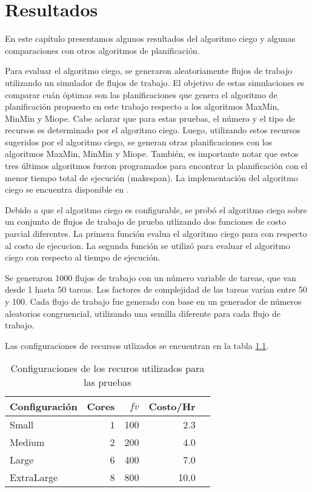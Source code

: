 \chapter{Resultados}
\label{chap:results}

En este capítulo presentamos algunos resultados del algoritmo ciego y algunas comparaciones con otros algoritmos de planificación. 

Para evaluar el algoritmo ciego, se generaron aleatoriamente flujos de trabajo utilizando un simulador de flujos de trabajo. El objetivo de estas simulaciones es comparar cuán óptimas son las planificaciones que genera el algoritmo de planificación propuesto en este trabajo respecto a los algoritmos MaxMin, MinMin y Miope. Cabe aclarar que para estas pruebas, el número y el tipo de recursos es determinado por el algoritmo ciego. Luego, utilizando estos recursos sugeridos por el algoritmo ciego, se generan otras planificaciones con los algoritmos MaxMin, MinMin y Miope. También, es importante notar que estos tres \'ultimos algoritmos fueron programados para encontrar la planificación con el menor tiempo total de ejecución (makespan). La implementaci\'on del algoritmo ciego se encuentra disponible en \cite{dominofire2014workflowsimulator}.

Debido a que el algoritmo ciego es configurable, se prob\'o el algoritmo ciego sobre un conjunto de flujos de trabajo de prueba utlizando dos funciones de costo parcial diferentes. La primera funci\'on evalua el algoritmo ciego para con respecto al costo de ejecucion. La segunda funci\'on se utiliz\'o para evaluar el algoritmo ciego con respecto al tiempo de ejecuci\'on.

Se generaron 1000 flujos de trabajo con un número variable de tareas, que van desde 1 hasta 50 tareas. Los factores de complejidad de las tareas varían entre 50 y 100. Cada flujo de trabajo fue generado con base en un generador de números aleatorios congruencial, utilizando una semilla diferente para cada flujo de trabajo.

Las configuraciones de recursos utlizados se encuentran en la tabla \ref{table:resource_configurations}.

\begin{table}[ht]
\centering
\begin{tabular}{lrrrr}
  \hline
Configuraci\'on & Cores & $fv$ & Costo/Hr \\ 
  \hline
  Small & 1 & 100 & 2.3 \\ 
  Medium & 2 & 200 & 4.0 \\ 
  Large & 6 & 400 & 7.0 \\ 
  ExtraLarge & 8 & 800 & 10.0 \\ 
   \hline
\end{tabular}
\caption{Configuraciones de los recuros utilizados para las pruebas} 
\label{table:resource_configurations}
\end{table}

